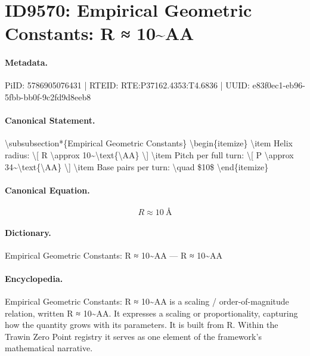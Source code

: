 \section*{ID9570: Empirical Geometric Constants: R ≈ 10\textasciitilde{}AA}
\paragraph{Metadata.}
PiID: 5786905076431 | RTEID: RTE:P37162.4353:T4.6836 | UUID: e83f0ec1-eb96-5fbb-bb0f-9c2fd9d8eeb8

\paragraph{Canonical Statement.}
\textbackslash{}subsubsection*\{Empirical Geometric Constants\} \textbackslash{}begin\{itemize\} \textbackslash{}item Helix radius: \textbackslash{}[ R \textbackslash{}approx 10\textasciitilde{}\textbackslash{}text\{\textbackslash{}AA\} \textbackslash{}] \textbackslash{}item Pitch per full turn: \textbackslash{}[ P \textbackslash{}approx 34\textasciitilde{}\textbackslash{}text\{\textbackslash{}AA\} \textbackslash{}] \textbackslash{}item Base pairs per turn: \textbackslash{}quad \$10\$ \textbackslash{}end\{itemize\}

\paragraph{Canonical Equation.}
\[
R \approx 10~\text{\AA}
\]

\paragraph{Dictionary.}
Empirical Geometric Constants: R ≈ 10\textasciitilde{}AA — R ≈ 10\textasciitilde{}AA

\paragraph{Encyclopedia.}
Empirical Geometric Constants: R ≈ 10\textasciitilde{}AA is a scaling / order-of-magnitude relation, written R ≈ 10\textasciitilde{}AA. It expresses a scaling or proportionality, capturing how the quantity grows with its parameters. It is built from R. Within the Trawin Zero Point registry it serves as one element of the framework's mathematical narrative.
